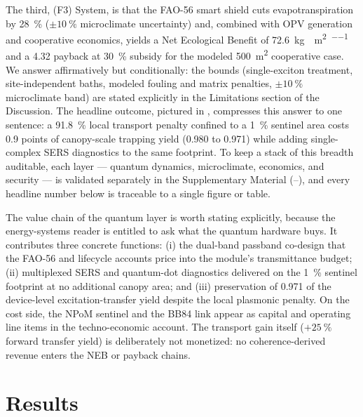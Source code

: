 \documentclass[preprint,12pt]{elsarticle}
\begin{document}
The third, (F3) System, is that the FAO-56 smart shield cuts evapotranspiration by \qty{28}{\percent} ($\pm\qty{10}{\percent}$ microclimate uncertainty) and, combined with OPV generation and cooperative economics, yields a Net Ecological Benefit of \qty{72.6}{\kg{}\per\m\squared\per\yr} and a \qty{4.32}{\yr} payback at \qty{30}{\percent} subsidy for the modeled \qty{500}{\m\squared} cooperative case.
We answer affirmatively but conditionally: the bounds (single-exciton treatment, site-independent baths, modeled fouling and matrix penalties, $\pm\qty{10}{\percent}$ microclimate band) are stated explicitly in the Limitations section of the Discussion.
The headline outcome, pictured in , compresses this answer to one sentence: a \qty{91.8}{\percent} local transport penalty confined to a \qty{1}{\percent} sentinel area costs 0.9 points of canopy-scale trapping yield (\num{0.980} to \num{0.971}) while adding single-complex SERS diagnostics to the same footprint.
To keep a stack of this breadth auditable, each layer --- quantum dynamics, microclimate, economics, and security --- is validated separately in the Supplementary Material (--), and every headline number below is traceable to a single figure or table.

The value chain of the quantum layer is worth stating explicitly, because the energy-systems reader is entitled to ask what the quantum hardware buys. It contributes three concrete functions: (i) the dual-band passband co-design that the FAO-56 and lifecycle accounts price into the module's transmittance budget; (ii) multiplexed SERS and quantum-dot diagnostics delivered on the \qty{1}{\percent} sentinel footprint at no additional canopy area; and (iii) preservation of \num{0.971} of the device-level excitation-transfer yield despite the local plasmonic penalty. On the cost side, the NPoM sentinel and the BB84 link appear as capital and operating line items in the techno-economic account. The transport gain itself ($+\qty{25}{\percent}$ forward transfer yield) is deliberately not monetized: no coherence-derived revenue enters the NEB or payback chains.


\section{Results}
\end{document}
